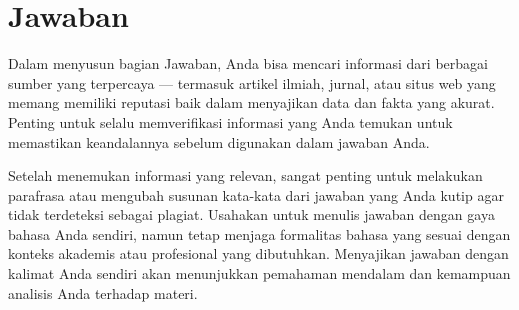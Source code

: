 \section{Jawaban}


Dalam menyusun bagian Jawaban, Anda bisa mencari informasi dari berbagai sumber yang terpercaya --- termasuk artikel ilmiah, jurnal, atau situs web yang memang memiliki reputasi baik dalam menyajikan data dan fakta yang akurat. Penting untuk selalu memverifikasi informasi yang Anda temukan untuk memastikan keandalannya sebelum digunakan dalam jawaban Anda.

Setelah menemukan informasi yang relevan, sangat penting untuk melakukan parafrasa atau mengubah susunan kata-kata dari jawaban yang Anda kutip agar tidak terdeteksi sebagai plagiat. Usahakan untuk menulis jawaban dengan gaya bahasa Anda sendiri, namun tetap menjaga formalitas bahasa yang sesuai dengan konteks akademis atau profesional yang dibutuhkan. Menyajikan jawaban dengan kalimat Anda sendiri akan menunjukkan pemahaman mendalam dan kemampuan analisis Anda terhadap materi.